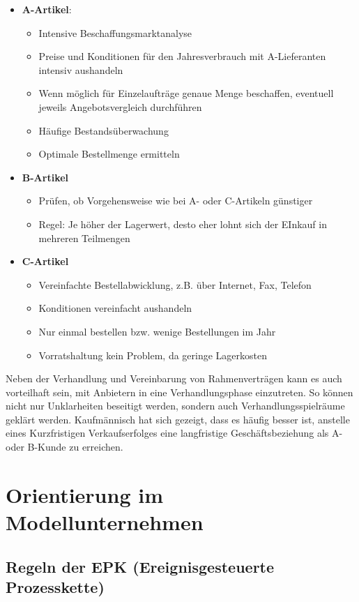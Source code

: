 \documentclass[a4paper, 12pt]{report}
\begin{document}
\begin{itemize}
    \item \textbf{A-Artikel}:
    \begin{itemize}
	\item Intensive Beschaffungsmarktanalyse
	\item Preise und Konditionen für den Jahresverbrauch mit A-Lieferanten
	    intensiv aushandeln
	\item Wenn möglich für Einzelaufträge genaue Menge beschaffen, eventuell
	    jeweils Angebotsvergleich durchführen
	\item Häufige Bestandsüberwachung
	\item Optimale Bestellmenge ermitteln
    \end{itemize}
    \item \textbf{B-Artikel}
    \begin{itemize}
	\item Prüfen, ob Vorgehensweise wie bei A- oder C-Artikeln günstiger
	\item Regel: Je höher der Lagerwert, desto eher lohnt sich der EInkauf
	    in mehreren Teilmengen
    \end{itemize}
    \item \textbf{C-Artikel}
    \begin{itemize}
	\item Vereinfachte Bestellabwicklung, z.B. über Internet, Fax, Telefon
	\item Konditionen vereinfacht aushandeln
	\item Nur einmal bestellen bzw. wenige Bestellungen im Jahr
	\item Vorratshaltung kein Problem, da geringe Lagerkosten
    \end{itemize}
\end{itemize}

Neben der Verhandlung und Vereinbarung von Rahmenverträgen kann es auch
vorteilhaft sein, mit Anbietern in eine Verhandlungsphase einzutreten. So können
nicht nur Unklarheiten beseitigt werden, sondern auch Verhandlungsspielräume
geklärt werden. Kaufmännisch hat sich gezeigt, dass es häufig besser ist,
anstelle  eines Kurzfristigen Verkaufserfolges eine langfristige
Geschäftsbeziehung als A- oder B-Kunde zu erreichen.

\section{Orientierung im Modellunternehmen}

\subsection{Regeln der EPK (Ereignisgesteuerte Prozesskette)}
\end{document}
